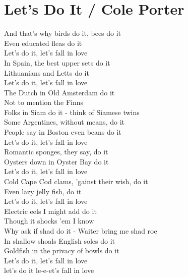 \section{Let's Do It / Cole Porter}\label{sec:letsdoit}
\Csix
\Gseven
\DminorSeven
\EminorEasy
\Cseven
\Fminor
\EflatSix

And that's why  birds do it,  bees do it\\
 Even educated  fleas do it\\
 Let's do it,  let's fall in  love\\
 In Spain, the  best upper  sets do it\\
 Lithuanians and  Letts do it\\
 Let's do it,  let's fall in   love\\
The Dutch in  Old Amsterdam do it\\
 Not to mention the  Finns\\
 Folks in Siam do it -  think of Siamese  twins\\
 Some Argentines, without  means, do it\\
 People say in Boston even  beans do it\\
 Let's do it,  let's fall in  love\\
 Romantic  sponges, they  say, do it\\
 Oysters down in Oyster   Bay do it\\
 Let's do it,  let's fall in  love\\
 Cold Cape Cod  clams, 'gainst their  wish, do it\\
 Even lazy jelly fish, do it\\
 Let's do it,  let's fall in  love\\
Electric eels  I might add do it\\
 Though it shocks 'em I  know\\
 Why ask if  shad do it -  Waiter bring me shad  roe\\
 In shallow  shoals English  soles do it\\
 Goldfish in the privacy of  bowls do it\\
 Let's do it,  let's fall in  love\\
 let's do it  le-e-et's fall in  love  \\
